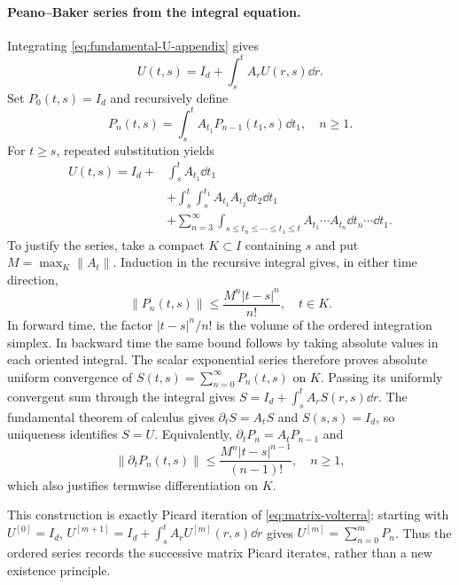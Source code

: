\documentclass[12pt,a4paper,oneside]{book}
\begin{document}
\paragraph{Peano--Baker series from the integral equation.}
Integrating \eqref{eq:fundamental-U-appendix} gives
\begin{equation}
 U(t,s)=I_d+\int_s^t A_rU(r,s)\dd r.
\label{eq:matrix-volterra}
\end{equation}
Set $P_0(t,s)=I_d$ and recursively define
\begin{equation*}
P_n(t,s)=\int_s^t A_{t_1}P_{n-1}(t_1,s)\dd t_1,\quad n\ge1.
\end{equation*}
For $t\ge s$, repeated substitution yields
\begin{equation*}
\begin{split}
 U(t,s)=I_d+&\int_s^t A_{t_1}\dd t_1\\
 &+\int_s^t\int_s^{t_1}A_{t_1}A_{t_2}\dd t_2\dd t_1\\
 &+\sum_{n=3}^\infty\int_{s\le t_n\le\cdots\le t_1\le t}
 A_{t_1}\cdots A_{t_n}\dd t_n\cdots\dd t_1.
\end{split}
\end{equation*}
To justify the series, take a compact $K\subset I$ containing $s$
and put $M=\max_K\|A_t\|$. Induction in the recursive integral
gives, in either time direction,
\begin{equation*}
\|P_n(t,s)\|\le\frac{M^n|t-s|^n}{n!},\quad t\in K.
\end{equation*}
In forward time, the factor $|t-s|^n/n!$ is the volume of the
ordered integration simplex. In backward time the same bound
follows by taking absolute values in each oriented integral.
The scalar exponential series therefore proves absolute uniform
convergence of $S(t,s)=\sum_{n=0}^\infty P_n(t,s)$ on $K$.
Passing its uniformly convergent sum through the integral gives
$S=I_d+\int_s^t A_rS(r,s)\dd r$. The fundamental theorem of
calculus gives $\partial_tS=A_tS$ and $S(s,s)=I_d$, so uniqueness
identifies $S=U$. Equivalently,
$\partial_tP_n=A_tP_{n-1}$ and
\begin{equation*}
\|\partial_tP_n(t,s)\|
 \le\frac{M^n|t-s|^{n-1}}{(n-1)!},\quad n\ge1,
\end{equation*}
which also justifies termwise differentiation on $K$.

This construction is exactly Picard iteration of
\eqref{eq:matrix-volterra}: starting with $U^{[0]}=I_d$,
$U^{[m+1]}=I_d+\int_s^t A_rU^{[m]}(r,s)\dd r$ gives
$U^{[m]}=\sum_{n=0}^m P_n$. Thus the ordered series records the
successive matrix Picard iterates, rather than a new existence principle.
\end{document}

